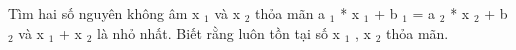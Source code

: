 Tìm hai số nguyên không âm x $_ 1 $ và x $_ 2 $ thỏa mãn a $_ 1 $ * x $_ 1 $ + b $_ 1 $ = a $_ 2 $ * x $_ 2 $ + b $_ 2 $ và x $_ 1 $ + x $_ 2 $ là nhỏ nhất. Biết rằng luôn tồn tại số x $_ 1 $ , x $_ 2 $ thỏa mãn.